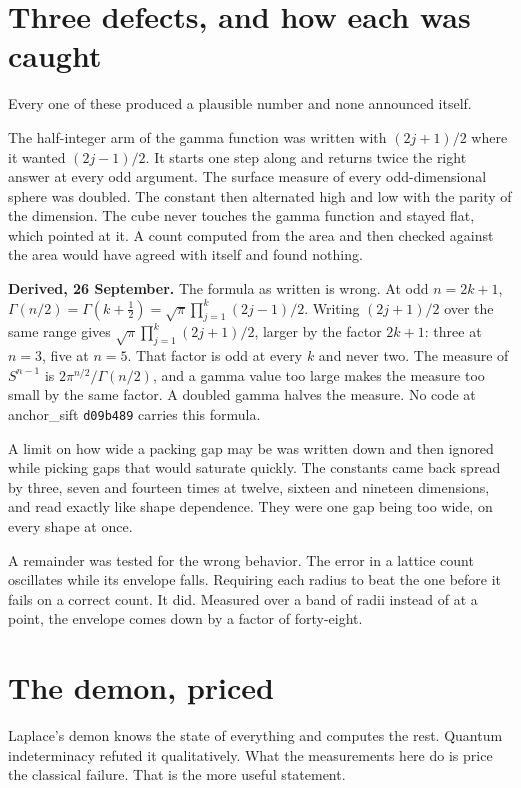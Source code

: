 \section{Three defects, and how each was caught}

Every one of these produced a plausible number and none announced itself.

The half-integer arm of the gamma function was written with $(2j+1)/2$ where it wanted $(2j-1)/2$. It starts one step along and returns twice the right answer at every odd argument. The surface measure of every odd-dimensional sphere was doubled. The constant then alternated high and low with the parity of the dimension. The cube never touches the gamma function and stayed flat, which pointed at it. A count computed from the area and then checked against the area would have agreed with itself and found nothing.

\textbf{Derived, 26 September.} The formula as written is wrong. At odd $n = 2k+1$, $\Gamma(n/2) = \Gamma(k + \tfrac12) = \sqrt{\pi}\prod_{j=1}^{k}(2j-1)/2$. Writing $(2j+1)/2$ over the same range gives $\sqrt{\pi}\prod_{j=1}^{k}(2j+1)/2$, larger by the factor $2k+1$: three at $n = 3$, five at $n = 5$. That factor is odd at every $k$ and never two. The measure of $S^{n-1}$ is $2\pi^{n/2}/\Gamma(n/2)$, and a gamma value too large makes the measure too small by the same factor. A doubled gamma halves the measure. No code at anchor\_sift \texttt{d09b489} carries this formula.

A limit on how wide a packing gap may be was written down and then ignored while picking gaps that would saturate quickly. The constants came back spread by three, seven and fourteen times at twelve, sixteen and nineteen dimensions, and read exactly like shape dependence. They were one gap being too wide, on every shape at once.

A remainder was tested for the wrong behavior. The error in a lattice count oscillates while its envelope falls. Requiring each radius to beat the one before it fails on a correct count. It did. Measured over a band of radii instead of at a point, the envelope comes down by a factor of forty-eight.

\section{The demon, priced}

Laplace's demon knows the state of everything and computes the rest. Quantum indeterminacy refuted
it qualitatively. What the measurements here do is price the classical failure. That is the more
useful statement.

